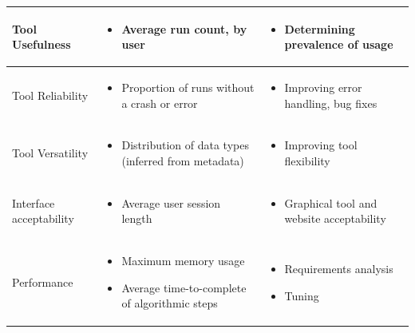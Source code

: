 \documentclass{article}
\begin{document}
\begin{table}[h!]
\begin{tabular}{|p{}|p{}|p{}|}
    \hline
    Tool Usefulness & 
    \begin{itemize}
         \item Average run count, by user
    \end{itemize}  &
    \begin{itemize}
         \item Determining prevalence of usage
    \end{itemize} \\
    \hline
    Tool Reliability & 
    \begin{itemize}
         \item Proportion of runs without a crash or error
    \end{itemize}  &
    \begin{itemize}
        \item Improving error handling, bug fixes 
    \end{itemize} \\
    \hline
    Tool Versatility &
        \begin{itemize}
        \item Distribution of data types (inferred from metadata) 
        \end{itemize} &
        \begin{itemize}
        \item Improving tool flexibility
        \end{itemize}\\
    \hline
    Interface acceptability &
    \begin{itemize}
        \item Average user session length
    \end{itemize} &
    \begin{itemize}
        \item Graphical tool and website acceptability
        \end{itemize}\\
    \hline
    Performance &
    \begin{itemize}
        \item Maximum memory usage
        \item Average time-to-complete of algorithmic steps 
    \end{itemize} &
    \begin{itemize}
        \item{Requirements analysis}
        \item{Tuning}
    \end{itemize}\\
    \hline
  \end{tabular}
  \label{tab:metrics_table}
\end{table}
\end{document}
